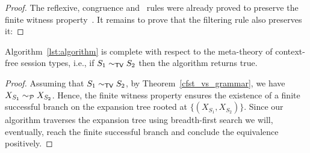 \begin{proof}
	The reflexive, congruence and \BPA\ rules were already proved to 
	preserve the finite witness property~\cite{janvcar1999techniques}.
	It remains to prove that the filtering rule also preserves 
	it: 
\end{proof}

\begin{theorem}
	Algorithm~\ref{lst:algorithm} is complete with respect to the meta-theory 
	of context-free session types, i.e., if $S_1 \sim_{\mathsf{TV}} S_2$ then 
	the algorithm returns \textsf{true}.
\end{theorem}

\begin{proof}
	Assuming that $S_1 \sim_{\mathsf{TV}} S_2$, by Theorem~\ref{cfst_vs_grammar}, we 
	have $X_{S_1} \sim_{\mathcal{P}} X_{S_2}$. Hence, the finite witness property 
	ensures the existence of a finite successful branch on the expansion 
	tree rooted at $\{(X_{S_1},  X_{S_2})\}$. Since our algorithm traverses 
	the expansion tree using breadth-first search we will, eventually, 
	reach the finite successful branch and conclude the equivalence positively.
\end{proof}
